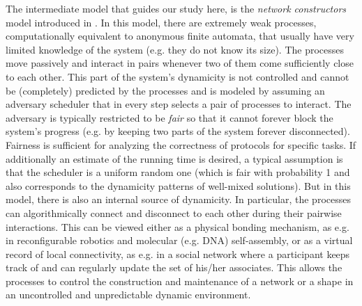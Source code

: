 \documentclass[preprint]{elsarticle}
\begin{document}
The intermediate model that guides our study here, is the \emph{network constructors} model introduced in \cite{MS14}. In this model, there are  extremely weak processes, computationally equivalent to anonymous finite automata, that usually have very limited knowledge of the system (e.g. they do not know its size). The processes move passively and interact in pairs whenever two of them come sufficiently close to each other. This part of the system's dynamicity is not controlled and cannot be (completely) predicted by the processes and is modeled by assuming an adversary scheduler that in every step selects a pair of processes to interact. The adversary is typically restricted to be \emph{fair} so that it cannot forever block the system's progress (e.g. by keeping two parts of the system forever disconnected). Fairness is sufficient for analyzing the correctness of protocols for specific tasks. If additionally an estimate of the running time is desired, a typical assumption is that the scheduler is a uniform random one (which is fair with probability 1 \cite{CDFMS09} and also corresponds to the dynamicity patterns of well-mixed solutions). But in this model, there is also an internal source of dynamicity. In particular, the processes can algorithmically connect and disconnect to each other during their pairwise interactions. This can be viewed either as a physical bonding mechanism, as e.g. in reconfigurable robotics and molecular (e.g. DNA) self-assembly, or as a virtual record of local connectivity, as e.g. in a social network where a participant keeps track of and can regularly update the set of his/her associates. This allows the processes to control the construction and maintenance of a network or a shape in an uncontrolled and unpredictable dynamic environment. 
\end{document}
